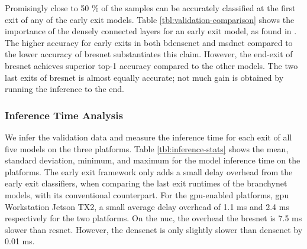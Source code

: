 Promisingly close to 50 \% of the samples can be accurately classified at the first exit of any of the early exit models. Table \ref{tbl:validation-comparison} shows the importance of the densely connected layers for an early exit model, as found in \cite{huang_multi-scale_2017}.  The higher accuracy for early exits in both \gls{bdensenet} and \gls{msdnet} compared to the lower accuracy of \gls{bresnet} substantiates this claim. However, the end-exit of \gls{bresnet} achieves superior top-1 accuracy compared to the other models. The two last exits of \gls{bresnet} is almost equally accurate; not much gain is obtained by running the inference to the end.  
\subsubsection{Inference Time Analysis}
We infer the validation data and measure the inference time for each exit of all five models on the three platforms. Table \ref{tbl:inference-stats} shows the mean, standard deviation, minimum, and maximum for the model inference time on the platforms. The early exit framework only adds a small delay overhead from the early exit classifiers, when comparing the last exit runtimes of the \gls{branchynet} models, with its conventional counterpart. For the \gls{gpu}-enabled platforms, \gls{gpu} Workstation Jetson TX2, a small average delay overhead of 1.1 ms and 2.4 ms respectively for the two platforms. On the \gls{nuc}, the overhead the \gls{bresnet} is  7.5 ms slower than \gls{resnet}. However, the \gls{densenet} is only slightly slower than \gls{densenet} by 0.01 ms.   
